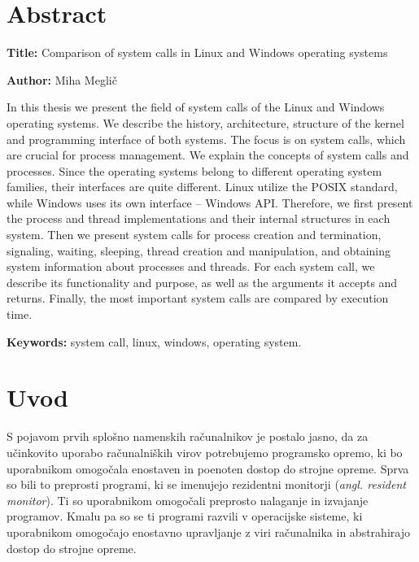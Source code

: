\documentclass[a4paper,12pt,openright]{book}
\newcommand{\ttitleEn}{Comparison of system calls in Linux and Windows operating systems}
\newcommand{\tauthor}{Miha Meglič}
\newcommand{\tkeywordsEn}{system call, linux, windows, operating system}
\newcommand{\clearemptydoublepage}{\newpage{\pagestyle{empty}\cleardoublepage}}
\begin{document}
\chapter*{Abstract}

\noindent\textbf{Title:} \ttitleEn
\bigskip

\noindent\textbf{Author:} \tauthor
\bigskip

\noindent In this thesis we present the field of system calls of the Linux and Windows operating systems.
We describe the history, architecture, structure of the kernel and programming interface of both systems.
The focus is on system calls, which are crucial for process management.
We explain the concepts of system calls and processes.
Since the operating systems belong to different operating system families, their interfaces are quite different.
Linux utilize the POSIX standard, while Windows uses its own interface -- Windows API.
Therefore, we first present the process and thread implementations and their internal structures in each system.
Then we present system calls for process creation and termination, signaling, waiting, sleeping, thread creation and manipulation, and obtaining system information about processes and threads.
For each system call, we describe its functionality and purpose, as well as the arguments it accepts and returns.
Finally, the most important system calls are compared by execution time.

\bigskip

\noindent\textbf{Keywords:} \tkeywordsEn.
\clearemptydoublepage

\mainmatter
\setcounter{page}{1}
\pagestyle{fancy}

\chapter{Uvod}

S pojavom prvih splošno namenskih računalnikov je postalo jasno, da za učinkovito uporabo računalniških virov potrebujemo programsko opremo, ki bo uporabnikom omogočala enostaven in poenoten dostop do strojne opreme.
Sprva so bili to preprosti programi, ki se imenujejo rezidentni monitorji (\textit{angl. resident monitor}).
Ti so uporabnikom omogočali preprosto nalaganje in izvajanje programov.
Kmalu pa so se ti programi razvili v operacijske sisteme, ki uporabnikom omogočajo enostavno upravljanje z viri računalnika in abstrahirajo dostop do strojne opreme.
\end{document}
